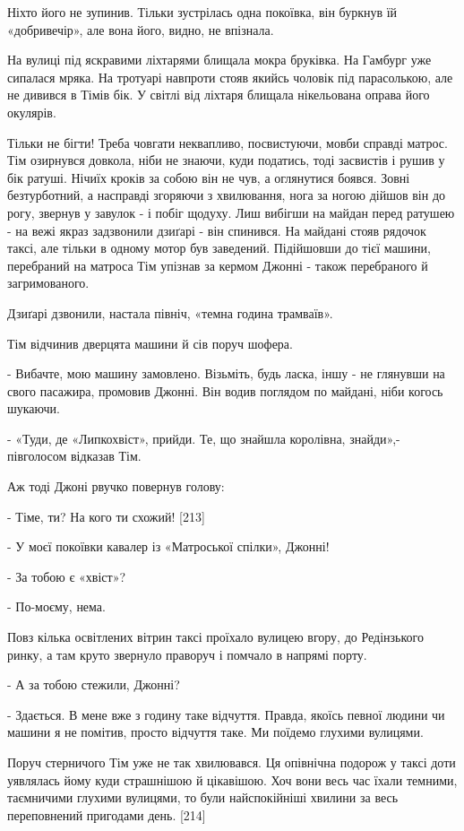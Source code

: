 Ніхто його не зупинив. Тільки зустрілась одна покоївка, він буркнув їй «добривечір», але вона його, видно, не впізнала.

На вулиці під яскравими ліхтарями блищала мокра бруківка. На Гамбург уже сипалася мряка. На тротуарі навпроти стояв якийсь чоловік під парасолькою, але не дивився в Тімів бік. У світлі від ліхтаря блищала нікельована оправа його окулярів.

Тільки не бігти! Треба човгати неквапливо, посвистуючи, мовби справді матрос. Тім озирнувся довкола, ніби не знаючи, куди податись, тоді засвистів і рушив у бік ратуші. Нічиїх кроків за собою він не чув, а оглянутися боявся. Зовні безтурботний, а насправді згоряючи з хвилювання, нога за ногою дійшов він до рогу, звернув у завулок - і побіг щодуху. Лиш вибігши на майдан перед ратушею - на вежі якраз задзвонили дзиґарі - він спинився. На майдані стояв рядочок таксі, але тільки в одному мотор був заведений. Підійшовши до тієї машини, перебраний на матроса Тім упізнав за кермом Джонні - також перебраного й загримованого.

Дзиґарі дзвонили, настала північ, «темна година трамваїв».

Тім відчинив дверцята машини й сів поруч шофера.

- Вибачте, мою машину замовлено. Візьміть, будь ласка, іншу - не глянувши на свого пасажира, промовив Джонні. Він водив поглядом по майдані, ніби когось шукаючи.

- «Туди, де «Липкохвіст», прийди. Те, що знайшла королівна, знайди»,- півголосом відказав Тім.

Аж тоді Джоні рвучко повернув голову:

- Тіме, ти? На кого ти схожий! [213]

- У моєї покоївки кавалер із «Матроської спілки», Джонні!

- За тобою є «хвіст»?

- По-моєму, нема.

Повз кілька освітлених вітрин таксі проїхало вулицею вгору, до Редінзького ринку, а там круто звернуло праворуч і помчало в напрямі порту.

- А за тобою стежили, Джонні?

- Здається. В мене вже з годину таке відчуття. Правда, якоїсь певної людини чи машини я не помітив, просто відчуття таке. Ми поїдемо глухими вулицями.

Поруч стерничого Тім уже не так хвилювався. Ця опівнічна подорож у таксі доти уявлялась йому куди страшнішою й цікавішою. Хоч вони весь час їхали темними, таємничими глухими вулицями, то були найспокійніші хвилини за весь переповнений пригодами день. [214]

